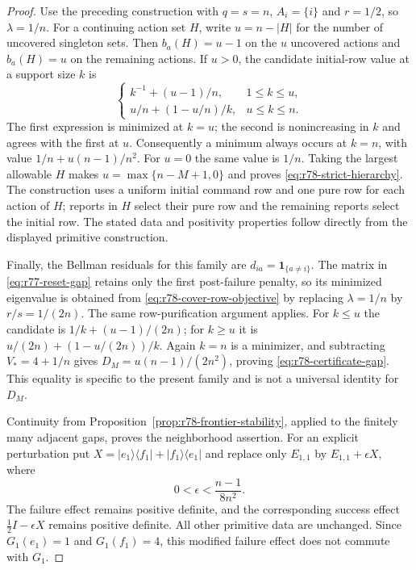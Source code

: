 \begin{proof}
Use the preceding construction with $q=s=n$, $A_i=\{i\}$ and
$r=1/2$, so $\lambda=1/n$.  For a continuing action set $H$,
write $u=n-|H|$ for the number of uncovered singleton sets.
Then $b_a(H)=u-1$ on the $u$ uncovered actions and $b_a(H)=u$
on the remaining actions.  If $u>0$, the candidate initial-row
value at a support size $k$ is
\[
 \begin{cases}
  k^{-1}+(u-1)/n,&1\le k\le u,\\[2pt]
  u/n+(1-u/n)/k,&u\le k\le n.
 \end{cases}
\]
The first expression is minimized at $k=u$; the second is
nonincreasing in $k$ and agrees with the first at $u$.  Consequently
a minimum always occurs at $k=n$, with value
$1/n+u(n-1)/n^2$.  For $u=0$ the same value is $1/n$.
Taking the largest allowable $H$ makes
$u=\max\{n-M+1,0\}$ and proves
\eqref{eq:r78-strict-hierarchy}.  The construction uses a uniform
initial command row and one pure row for each action of $H$;
reports in $H$ select their pure row and the remaining reports
select the initial row.  The stated data and positivity properties
follow directly from the displayed primitive construction.

Finally, the Bellman residuals for this family are
$d_{ia}=\mathbf1_{\{a\ne i\}}$.  The matrix in
\eqref{eq:r77-reset-gap} retains only the first post-failure
penalty, so its minimized eigenvalue is obtained from
\eqref{eq:r78-cover-row-objective} by replacing $\lambda=1/n$
by $r/s=1/(2n)$.  The same row-purification argument applies.
For $k\le u$ the candidate is $1/k+(u-1)/(2n)$; for $k\ge u$
it is $u/(2n)+(1-u/(2n))/k$.  Again $k=n$ is a minimizer,
and subtracting $V_*=4+1/n$ gives
$D_M=u(n-1)/(2n^2)$, proving
\eqref{eq:r78-certificate-gap}.  This equality is specific to
the present family and is not a universal identity for $D_M$.

Continuity from Proposition~\ref{prop:r78-frontier-stability},
applied to the finitely many adjacent gaps, proves the neighborhood
assertion.  For an explicit perturbation put
$X=|e_1\rangle\langle f_1|+|f_1\rangle\langle e_1|$ and replace
only $E_{1,1}$ by $E_{1,1}+\epsilon X$, where
\[
 0<\epsilon<\frac{n-1}{8n^2}.
\]
The failure effect remains positive definite, and the corresponding
success effect $\tfrac12I-\epsilon X$ remains positive definite.
All other primitive data are unchanged.  Since
$G_1(e_1)=1$ and $G_1(f_1)=4$, this modified failure effect does
not commute with $G_1$.


\end{proof}
